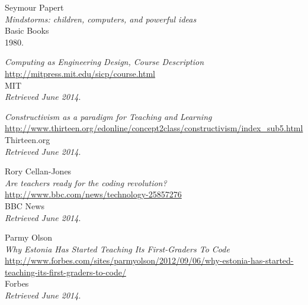 \begin{thebibliography}{99}
  Seymour Papert \\
  \emph{Mindstorms: children, computers, and powerful ideas} \\
  Basic Books \\
  1980.

  \emph{Computing as Engineering Design, Course Description} \\
  \url{http://mitpress.mit.edu/sicp/course.html} \\
  MIT \\
  \emph{Retrieved June 2014}.

  \emph{Constructivism as a paradigm for Teaching and Learning} \\
  \url{http://www.thirteen.org/edonline/concept2class/constructivism/index_sub5.html} \\
  Thirteen.org \\
  \emph{Retrieved June 2014}.

  Rory Cellan-Jones \\
  \emph{Are teachers ready for the coding revolution?} \\
  \url{http://www.bbc.com/news/technology-25857276} \\
  BBC News \\
  \emph{Retrieved June 2014}.

  Parmy Olson \\
  \emph{Why Estonia Has Started Teaching Its First-Graders To Code} \\
  \url{http://www.forbes.com/sites/parmyolson/2012/09/06/why-estonia-has-started-teaching-its-first-graders-to-code/} \\
  Forbes \\
  \emph{Retrieved June 2014}.

\end{thebibliography}
